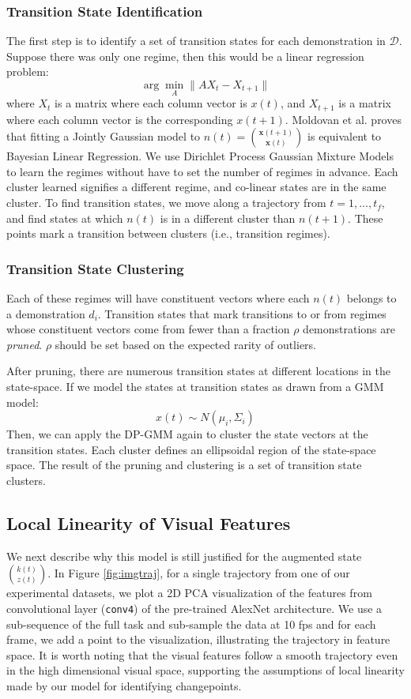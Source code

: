 \subsubsection{Transition State Identification}
The first step is to identify a set of transition states for each demonstration in $\mathcal{D}$.
Suppose there was only one regime, then this would be a linear regression problem:
\[
\arg\min_A \|A X_t - X_{t+1}\|
\]
where $X_t$ is a matrix where each column vector is $x(t)$, and $X_{t+1}$ is a matrix where each column vector is the corresponding $x(t+1)$.
Moldovan et al. \cite{moldovan2013dirichlet} proves that fitting a Jointly Gaussian model to $n(t) = \binom{\mathbf{x}(t+1)}{\mathbf{x}(t)}$ is equivalent to Bayesian Linear Regression.
We use Dirichlet Process Gaussian Mixture Models to learn the regimes without have to set the number of regimes in advance.
Each cluster learned signifies a different regime, and co-linear states are in the same cluster.
To find transition states, we move along a trajectory from $t=1,...,t_f$, and find states at which $n(t)$ is in a different cluster than $n(t+1)$.
These points mark a transition between clusters (i.e., transition regimes).


\subsubsection{Transition State Clustering}\label{prun}
Each of these regimes will have constituent vectors where each $n(t)$ belongs to a demonstration $d_i$. 
Transition states that mark transitions to or from regimes whose constituent vectors come from fewer than a fraction $\rho$ demonstrations are \emph{pruned}.
$\rho$ should be set based on the expected rarity of outliers.

After pruning, there are numerous transition states at different locations in the state-space.
If we model the states at transition states as drawn from a GMM model:
\[
{x}(t) \sim N(\mu_i, \Sigma_i)
\]
Then, we can apply the DP-GMM again to cluster the state vectors at the transition states.
Each cluster defines an ellipsoidal region of the state-space space.
The result of the pruning and clustering is a set of transition state clusters.

\subsection{Local Linearity of Visual Features}

We next describe why this model is still justified for the augmented state $\binom{k(t)}{z(t)}$.
In Figure \ref{fig:imgtraj}, for a single trajectory from one of our experimental datasets, we plot a 2D PCA visualization of the features from convolutional layer (\texttt{conv4}) of the pre-trained AlexNet architecture. We use a sub-sequence of the full task and sub-sample the data at 10 fps and for each frame, we add a point to the visualization, illustrating the trajectory in feature space. It is worth noting that the visual features follow a smooth trajectory even in the high dimensional visual space, supporting the assumptions of local linearity made by our model for identifying changepoints.


